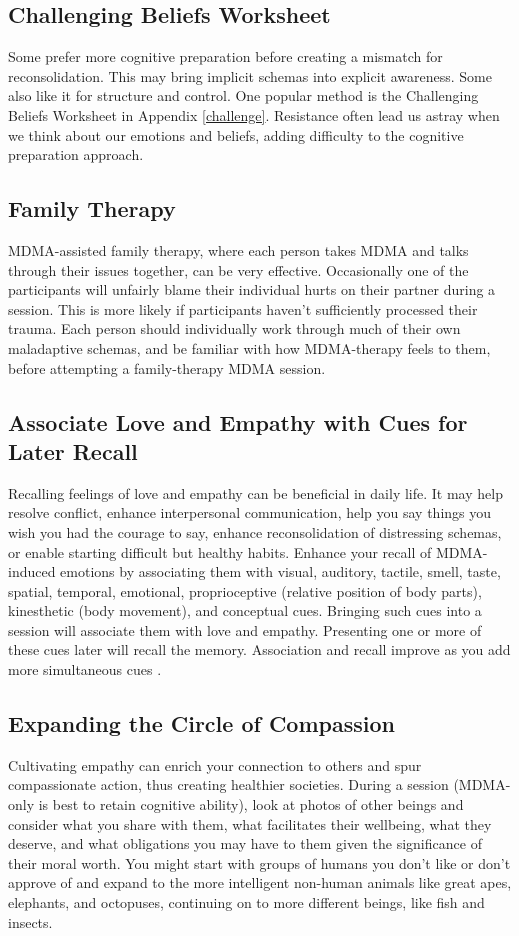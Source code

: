 \documentclass[12pt,letterpaper]{article}
\begin{document}
\subsection{Challenging Beliefs Worksheet}
\label{challengingBeliefsWorksheet}
Some prefer more cognitive preparation before creating a mismatch for reconsolidation. This may bring implicit schemas into explicit awareness. Some also like it for structure and control. One popular method is the Challenging Beliefs Worksheet in Appendix \ref{challenge}. Resistance often lead us astray when we think about our emotions and beliefs, adding difficulty to the cognitive preparation approach.
\subsection{Family Therapy}
MDMA-assisted family therapy, where each person takes MDMA and talks through their issues together, can be very effective. Occasionally one of the participants will unfairly blame their individual hurts on their partner during a session. This is more likely if participants haven't sufficiently processed their trauma. Each person should individually work through much of their own maladaptive schemas, and be familiar with how MDMA-therapy feels to them, before attempting a family-therapy MDMA session. 
\subsection{Associate Love and Empathy with Cues for Later Recall}
Recalling feelings of love and empathy can be beneficial in daily life. It may help resolve conflict, enhance interpersonal communication, help you say things you wish you had the courage to say, enhance reconsolidation of distressing schemas, or enable starting difficult but healthy habits. Enhance your recall of MDMA-induced emotions by associating them with visual, auditory, tactile, smell, taste, spatial, temporal, emotional, proprioceptive (relative position of body parts), kinesthetic (body movement), and conceptual cues. Bringing such cues into a session will associate them with love and empathy. Presenting one or more of these cues later will recall the memory. Association and recall improve as you add more simultaneous cues \cite{brownAttachmentDisturbances}. 
\subsection{Expanding the Circle of Compassion}
Cultivating empathy can enrich your connection to others and spur compassionate action, thus creating healthier societies. During a session (MDMA-only is best to retain cognitive ability), look at photos of other beings and consider what you share with them, what facilitates their wellbeing, what they deserve, and what obligations you may have to them given the significance of their moral worth. You might start with groups of humans you don't like or don't approve of and expand to the more intelligent non-human animals like great apes, elephants, and octopuses, continuing on to more different beings, like fish and insects.
\end{document}

